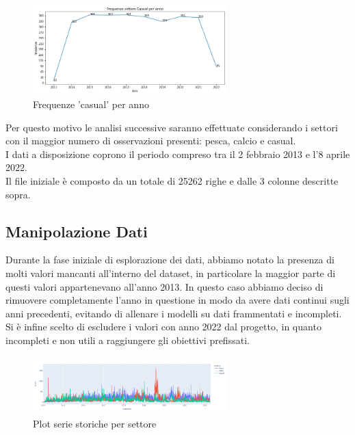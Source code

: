 \documentclass[12pt, a4paper, twocolumn]{article} %
\begin{document}
\begin{figure}[H]
  \caption{Frequenze 'casual' per anno}
  \begin{center}
    \includegraphics[width=75mm,scale=0.5]{frequenze-casual.png}
  \end{center}
\end{figure}

Per questo motivo le analisi successive saranno effettuate considerando i settori con il maggior numero di osservazioni presenti: pesca, calcio e casual.\\
I dati a disposizione coprono il periodo compreso tra il 2 febbraio 2013 e l'8 aprile 2022.\\
Il file iniziale è composto da un totale di 25262 righe e dalle 3 colonne descritte sopra.

\subsection{Manipolazione Dati}
Durante la fase iniziale di esplorazione dei dati, abbiamo notato la presenza di molti valori mancanti all'interno del dataset, in particolare la maggior parte di questi valori appartenevano all'anno 2013. In questo caso abbiamo deciso di rimuovere completamente l'anno in questione in modo da avere dati continui sugli anni precedenti, evitando di allenare i modelli su dati frammentati e incompleti.\\
Si è infine scelto di escludere i valori con anno 2022 dal progetto, in quanto incompleti e non utili a raggiungere gli obiettivi prefissati.
\begin{figure}[H]
  \caption{Plot serie storiche per settore}
  \begin{center}
    \includegraphics[width=75mm,scale=0.5]{plot_dati_settori.png}
  \end{center}
\end{figure}
\end{document}
